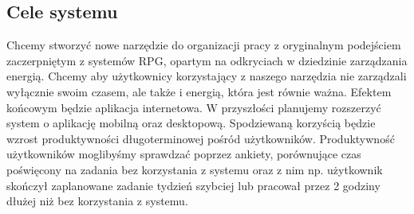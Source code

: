 \documentclass[a4paper,11pt]{report}
\begin{document}
\subsection {Cele systemu}
Chcemy stworzyć nowe narzędzie do organizacji pracy z oryginalnym podejściem zaczerpniętym z systemów RPG, opartym na odkryciach w dziedzinie zarządzania energią\cite{Harward}. Chcemy aby użytkownicy korzystający z naszego narzędzia nie zarządzali wyłącznie swoim czasem, ale także i energią, która jest równie ważna. Efektem końcowym będzie aplikacja internetowa. W przyszłości planujemy rozszerzyć system o aplikację mobilną oraz desktopową. Spodziewaną korzyścią będzie wzrost produktywności długoterminowej pośród użytkowników. Produktywność użytkowników moglibyśmy sprawdzać poprzez ankiety, porównujące czas poświęcony na zadania bez korzystania z systemu oraz z nim np. użytkownik skończył zaplanowane zadanie tydzień szybciej lub pracował przez 2 godziny dłużej niż bez korzystania z systemu.\\
\end{document}
